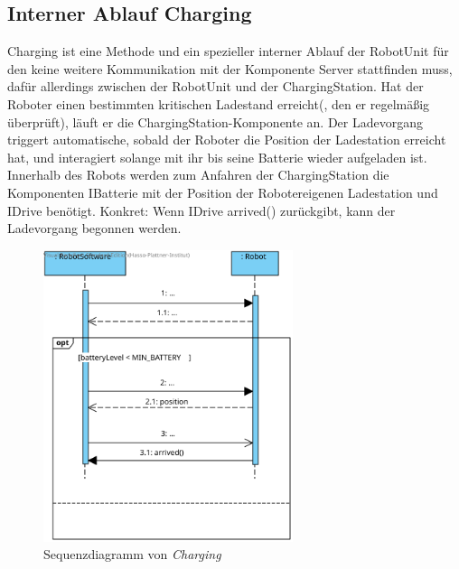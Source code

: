 	\subsection*{Interner Ablauf Charging}
	Charging ist eine Methode und ein spezieller interner Ablauf der RobotUnit für den keine weitere Kommunikation mit der Komponente Server stattfinden muss, dafür allerdings zwischen der RobotUnit und der ChargingStation. 
	Hat der Roboter einen bestimmten kritischen Ladestand erreicht(, den er regelmäßig überprüft), läuft er die ChargingStation-Komponente an. 
	Der Ladevorgang triggert automatische, sobald der Roboter die Position der Ladestation erreicht hat, und interagiert solange mit ihr bis seine Batterie wieder aufgeladen ist. 
	Innerhalb des Robots werden zum Anfahren der ChargingStation die Komponenten IBatterie mit der Position der Robotereigenen Ladestation und IDrive benötigt. 
	Konkret: Wenn IDrive arrived() zurückgibt, kann der Ladevorgang begonnen werden.
	\vspace{1cm}
	
	\begin{figure}[H]
		\centering
		\includegraphics[width=0.65\textwidth]{img/0-Entwurf-8-Charging}
		\caption{Sequenzdiagramm von \textit{Charging}}
		\label{Charging}
	\end{figure}
